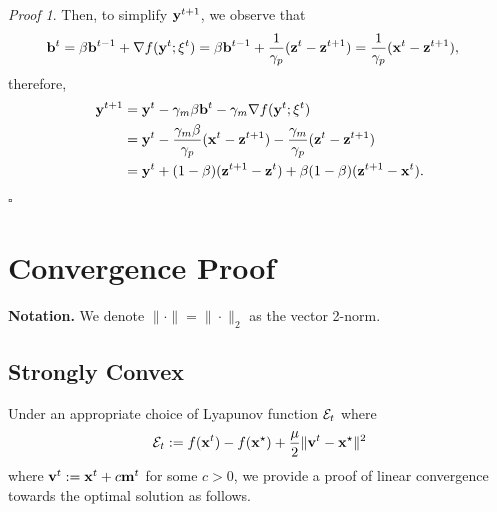 \documentclass{article}
\theoremstyle{plain}
\theoremstyle{definition}
\theoremstyle{remark}
\newtheorem{prooft}{Proof}
\def\bx{\mathbf{x}}
\begin{document}
\begin{prooft}
Then, to simplify ${\bf y}^{t+1}$, we observe that
\begin{align}
    {\bf b}^t &= \beta {\bf b}^{t-1} + \nabla f({\bf y}^t; \xi^t) =\beta {\bf b}^{t-1} + \frac{1}{\gamma_p} ({\bf z}^t - {\bf z}^{t+1}) = \frac{1}{\gamma_p}({\bf x}^t - {\bf z}^{t+1}),
\end{align}
therefore,
\begin{align}
    {\bf y}^{t+1} &= {\bf y}^t - \gamma_m\beta{\bf b}^t - \gamma_m \nabla f({\bf y}^t; \xi^t) \\
    &={\bf y}^t - \frac{\gamma_m \beta}{\gamma_p}({\bf x}^t - {\bf z}^{t+1}) - \frac{\gamma_m}{\gamma_p} ({\bf z}^t - {\bf z}^{t+1}) \\
    &= {\bf y}^{t} + (1- \beta)({\bf z}^{t+1} - {\bf z}^t) + \beta(1-\beta)({\bf z}^{t+1} - {\bf x}^t).
\end{align}
\hfill $\square$
\end{prooft}

\section{Convergence Proof}
{\bf Notation.} We denote $\| \cdot \| = \| \cdot \|_2$ as the vector 2-norm.
\subsection{Strongly Convex} \label{app:proof_strong_cvx}
Under an appropriate choice of Lyapunov function ${\cal E}_t$ where
\begin{equation} \label{eq:lyap_strong_cvx}
    {\cal E}_t := f(\bx^t) - f(\bx^\star) + \frac{\mu}{2} \| {\bf v}^t - \bx^\star \|^2
\end{equation}
where ${\bf v}^t := \bx^t + c{\bf m}^t$ for some $c > 0$, we provide a proof of linear convergence towards the optimal solution as follows.
\end{document}
